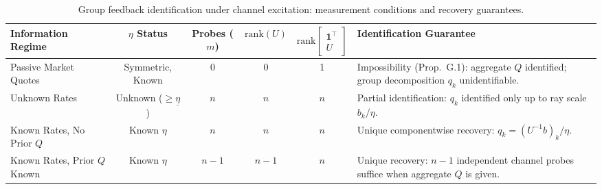 \begin{table}[htbp]
\centering\small
\caption{Group feedback identification under channel excitation: measurement conditions and recovery guarantees.}
\label{tab:T4_group_recovery}
\begin{tabularx}{\textwidth}{lccccY}
\toprule
Information Regime & $\eta$ Status & Probes ($m$) & $\mathrm{rank}(U)$ & $\mathrm{rank}\begin{bmatrix} \mathbf{1}^\top \\ U \end{bmatrix}$ & Identification Guarantee \\
\midrule
Passive Market Quotes & Symmetric, Known & 0 & 0 & 1 & Impossibility (Prop.~G.1): aggregate $Q$ identified; group decomposition $q_k$ unidentifiable. \\
Unknown Rates & Unknown ($\ge \underline\eta$) & $n$ & $n$ & $n$ & Partial identification: $q_k$ identified only up to ray scale $b_k / \eta$. \\
Known Rates, No Prior $Q$ & Known $\eta$ & $n$ & $n$ & $n$ & Unique componentwise recovery: $q_k = (U^{-1} b)_k / \eta$. \\
Known Rates, Prior $Q$ Known & Known $\eta$ & $n-1$ & $n-1$ & $n$ & Unique recovery: $n-1$ independent channel probes suffice when aggregate $Q$ is given. \\
\bottomrule
\end{tabularx}
\end{table}
